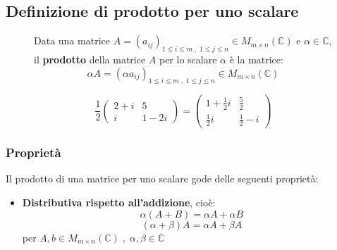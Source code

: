 \documentclass[a4paper]{article}
\theoremstyle{break}
\theoremstyle{break}
\theoremstyle{break}
\theoremstyle{break}
\begin{document}
\subsection{Definizione di prodotto per uno scalare}
\begin{figure}[H]
\begin{definition}
Data una matrice \( A = (a_{ij})_{1 \le i \le m\;,\;1 \le j \le n} \in M_{m \times n}(\mathbb{C}) \) e
\( \alpha \in \mathbb{C} \), il \textbf{prodotto} della matrice \( A \) per lo scalare
\( \alpha \) è la matrice:
\[
  \alpha A = (\alpha a_{ij})_{1 \le i \le m\;,\;1 \le j \le n} \in M_{m \times n}(\mathbb{C})
\] 
\end{definition}
\end{figure}
\begin{figure}[H]
\begin{example}
\[
  \frac{1}{2}\begin{pmatrix} 
    2+i & 5\\
    i & 1-2i
  \end{pmatrix} 
  =
  \begin{pmatrix} 
    1+\frac{1}{2}i & \frac{5}{2} \\
    \frac{1}{2}i & \frac{1}{2}-i
  \end{pmatrix}
\] 
\end{example}
\end{figure}

\subsubsection{Proprietà}
Il prodotto di una matrice per uno scalare gode delle seguenti proprietà:
\begin{itemize}
\item \textbf{Distributiva rispetto all'addizione}, cioè:
\[
  \alpha(A+B) = \alpha A + \alpha B
\] 
\[
  (\alpha + \beta)A = \alpha A + \beta A
\] 
per \( A,b \in M_{m \times n}(\mathbb{C})\;,\; \alpha,\beta \in \mathbb{C} \) 
\end{itemize}
\end{document}
